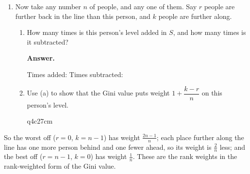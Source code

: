\begin{Form}
\begin{enumerate}
\begin{enumerate}
  \end{enumerate}
  \item Now take any number $n$ of people, and any one of them. Say $r$ people are further back in the line than this person, and $k$ people are further along.
  \begin{enumerate}
    \item How many times is this person's level added in $S$, and how many times is it subtracted?

\medskip\noindent\textbf{Answer.}\par\smallskip
Times added:  \qquad Times subtracted: 
\medskip

    \item Use (a) to show that the Gini value puts weight $1 + \dfrac{k - r}{n}$ on this person's level.
\begin{answer}{q4c2}{7cm}
\end{answer}

  \end{enumerate}
\end{enumerate}
So the worst off ($r = 0$, $k = n - 1$) has weight $\frac{2n-1}{n}$; each place further along the line has one more person behind and one fewer ahead, so its weight is $\frac2n$ less; and the best off ($r = n - 1$, $k = 0$) has weight $\frac1n$. These are the rank weights in the rank-weighted form of the Gini value.

\iffillable\end{Form}\fi


